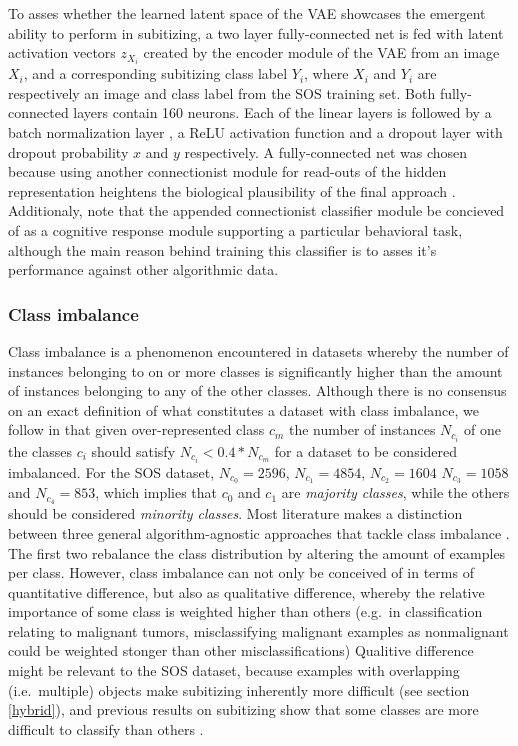 \documentclass[twocolumn]{article}
\begin{document}
{To asses whether the learned latent space of the VAE showcases the
emergent ability to perform in subitizing, a two layer fully-connected
net is fed with latent activation vectors \(z_{X_i}\) created by the
encoder module of the VAE from an image \(X_i\), and a corresponding
subitizing class label \(Y_i\), where \(X_i\) and \(Y_i\) are
respectively an image and class label from the SOS training set. Both
fully-connected layers contain 160 neurons. Each of the linear layers is
followed by a batch normalization layer \citep{ioffe2015batch}, a ReLU
activation function and a dropout layer \citep{srivastava2014dropout}
with dropout probability \(x\) and \(y\) respectively. A fully-connected
net was chosen because using another connectionist module for read-outs
of the hidden representation heightens the biological plausibility of
the final approach \citep{zorzi2013modeling}. Additionaly,
\citet{zorzi2013modeling} note that the appended connectionist
classifier module be concieved of as a cognitive response module
supporting a particular behavioral task, although the main reason behind
training this classifier is to asses it's performance against other
algorithmic data.

\hypertarget{imbalance}{%
\subsubsection{Class imbalance}\label{imbalance}}

Class imbalance is a phenomenon encountered in datasets whereby the
number of instances belonging to on or more classes is significantly
higher than the amount of instances belonging to any of the other
classes. Although there is no consensus on an exact definition of what
constitutes a dataset with class imbalance, we follow
\citet{fernandez2013} in that given over-represented class \(c_m\) the
number of instances \(N_{c_i}\) of one the classes \(c_i\) should
satisfy \(N_{c_i} < 0.4 * N_{c_m}\) for a dataset to be considered
imbalanced. For the SOS dataset, \(N_{c_0} = 2596\), \(N_{c_1} = 4854\),
\(N_{c_2} = 1604\) \(N_{c_3} = 1058\) and \(N_{c_4} = 853\), which
implies that \(c_0\) and \(c_1\) are \emph{majority classes}, while the
others should be considered \emph{minority classes}. Most literature
makes a distinction between three general algorithm-agnostic approaches
that tackle class imbalance \citep[for a discussion,
see][]{fernandez2013}. The first two rebalance the class distribution by
altering the amount of examples per class. However, class imbalance can
not only be conceived of in terms of quantitative difference, but also
as qualitative difference, whereby the relative importance of some class
is weighted higher than others (e.g.~in classification relating to
malignant tumors, misclassifying malignant examples as nonmalignant
could be weighted stonger than other misclassifications) Qualitive
difference might be relevant to the SOS dataset, because examples with
overlapping (i.e.~multiple) objects make subitizing inherently more
difficult (see section \ref{hybrid}), and previous results on
subitizing show that some classes are more difficult to classify than
others \citep{zhang2016salient}.

}
\end{document}

